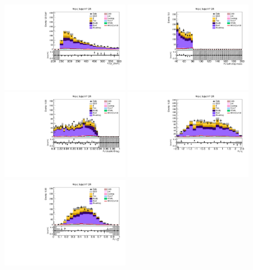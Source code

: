 \begin{figure}[tbp]
  \begin{center}
    \includegraphics[width=0.48\textwidth]{figures/wlnhbb2016/boosted/WenWHHeavyFlavorFJCR_fj1Pt.pdf}
    \includegraphics[width=0.48\textwidth]{figures/wlnhbb2016/boosted/WenWHHeavyFlavorFJCR_fj1MSD_corr.pdf}
    \includegraphics[width=0.48\textwidth]{figures/wlnhbb2016/boosted/WenWHHeavyFlavorFJCR_fj1DoubleCSV.pdf}
    \includegraphics[width=0.48\textwidth]{figures/wlnhbb2016/boosted/WenWHHeavyFlavorFJCR_fj1Eta.pdf}
    \includegraphics[width=0.48\textwidth]{figures/wlnhbb2016/boosted/WenWHHeavyFlavorFJCR_fj1Tau21SD.pdf}

\end{center}
\end{figure}
